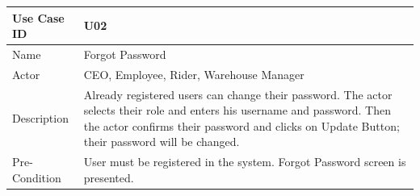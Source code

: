 \documentclass[12pt,a4paper]{report}
\begin{document}
\begin{tabular}{ | m{3cm} | m{12cm}| } \hline

Use Case ID & U02  \\\hline

Name  	    & Forgot Password  \\ \hline

Actor     	& CEO, Employee, Rider, Warehouse Manager \\ \hline

Description & Already registered users can change their password. The actor selects their role and enters his username and password. Then the actor confirms their password and clicks on Update Button; their password will be changed. \\ \hline

Pre-Condition & User must be registered in the system. Forgot Password screen is presented.  \\ \hline
\end{tabular}
\end{document}
